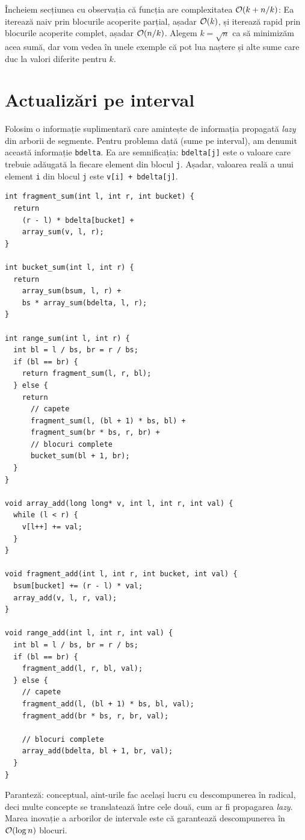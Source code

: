 \documentclass[../main.tex]{subfiles}
\begin{document}
Încheiem secțiunea cu observația că funcția  are complexitatea $\mathcal{O}(k + n/k)$: Ea iterează naiv prin blocurile acoperite parțial, așadar $\mathcal{O}(k)$, și iterează rapid prin blocurile acoperite complet, așadar $\mathcal{O}(n/k)$. Alegem $k = \sqrt{n}$ ca să minimizăm acea sumă, dar vom vedea în unele exemple că pot lua naștere și alte sume care duc la valori diferite pentru $k$.

\section{Actualizări pe interval}

Folosim o informație suplimentară care amintește de informația propagată \textit{lazy} din arborii de segmente. Pentru problema dată (sume pe interval), am denumit această informație \texttt{bdelta}. Ea are semnificația: \texttt{bdelta[j]} este o valoare care trebuie adăugată la fiecare element din blocul \texttt{j}. Așadar, valoarea reală a unui element \texttt{i} din blocul \texttt{j} este \texttt{v[i] + bdelta[j]}.

\begin{verbatim}
int fragment_sum(int l, int r, int bucket) {
  return
    (r - l) * bdelta[bucket] +
    array_sum(v, l, r);
}

int bucket_sum(int l, int r) {
  return
    array_sum(bsum, l, r) +
    bs * array_sum(bdelta, l, r);
}

int range_sum(int l, int r) {
  int bl = l / bs, br = r / bs;
  if (bl == br) {
    return fragment_sum(l, r, bl);
  } else {
    return
      // capete
      fragment_sum(l, (bl + 1) * bs, bl) +
      fragment_sum(br * bs, r, br) +
      // blocuri complete
      bucket_sum(bl + 1, br);
  }
}

void array_add(long long* v, int l, int r, int val) {
  while (l < r) {
    v[l++] += val;
  }
}

void fragment_add(int l, int r, int bucket, int val) {
  bsum[bucket] += (r - l) * val;
  array_add(v, l, r, val);
}

void range_add(int l, int r, int val) {
  int bl = l / bs, br = r / bs;
  if (bl == br) {
    fragment_add(l, r, bl, val);
  } else {
    // capete
    fragment_add(l, (bl + 1) * bs, bl, val);
    fragment_add(br * bs, r, br, val);

    // blocuri complete
    array_add(bdelta, bl + 1, br, val);
  }
}
\end{verbatim}

Paranteză: conceptual, aint-urile fac același lucru cu descompunerea în radical, deci multe concepte se translatează între cele două, cum ar fi propagarea \textit{lazy}. Marea inovație a arborilor de intervale este că garantează descompunerea în $\mathcal{O}(\log n)$ blocuri.
\end{document}
